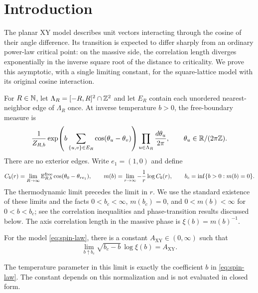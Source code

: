 \section{Introduction}\label{sec:introduction}
The planar XY model describes unit vectors interacting through the cosine of their angle difference. Its transition is expected to differ sharply from an ordinary power-law critical point: on the massive side, the correlation length diverges exponentially in the inverse square root of the distance to criticality. We prove this asymptotic, with a single limiting constant, for the square-lattice model with its original cosine interaction.

For $R\in\mathbb N$, let $\Lambda_R=[-R,R]^2\cap\mathbb Z^2$ and let $E_R$ contain each unordered nearest-neighbor edge of $\Lambda_R$ once. At inverse temperature $b>0$, the free-boundary measure is
\begin{equation}\label{eq:spin-law}
 \frac{1}{Z_{R,b}}\exp\!\left(b\sum_{\{u,v\}\in E_R}
                    \cos(\theta_u-\theta_v)\right)
       \prod_{u\in\Lambda_R}\frac{d\theta_u}{2\pi},
 \qquad \theta_u\in\mathbb R/(2\pi\mathbb Z).
\end{equation}
There are no exterior edges. Write $e_1=(1,0)$ and define
\begin{equation}\label{eq:mass-definition}
 C_b(r)=\lim_{R\to\infty}\mathbb E^{\mathrm{free}}_{R,b}
       \cos(\theta_0-\theta_{re_1}),\qquad
 m(b)=\lim_{r\to\infty}-\frac1r\log C_b(r),\qquad
 b_c=\inf\{b>0:m(b)=0\}.
\end{equation}
The thermodynamic limit precedes the limit in $r$. We use the standard existence of these limits and the facts $0<b_c<\infty$, $m(b_c)=0$, and $0<m(b)<\infty$ for $0<b<b_c$; see the correlation inequalities and phase-transition results discussed below. The axis correlation length in the massive phase is $\xi(b)=m(b)^{-1}$.

\begin{theorem}\label{thm:main}
For the model \eqref{eq:spin-law}, there is a constant $A_{\mathrm{XY}}\in(0,\infty)$ such that
\begin{equation}\label{eq:main-limit}
 \lim_{b\uparrow b_c}\sqrt{b_c-b}\,\log\xi(b)=A_{\mathrm{XY}}.
\end{equation}
\end{theorem}
The temperature parameter in this limit is exactly the coefficient $b$ in \eqref{eq:spin-law}. The constant depends on this normalization and is not evaluated in closed form.

